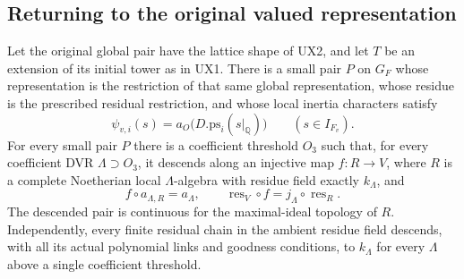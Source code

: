 \subsection{Returning to the original valued representation}

\begin{proposition}
Let the original global pair have the lattice shape of UX2,
and let $T$ be an extension of its initial tower as in UX1.
There is a small pair $P$ on $G_F$ whose representation is
the restriction of that same global representation,
whose residue is the prescribed residual restriction,
and whose local inertia characters satisfy
\[
 \psi_{v,i}(s)=a_O\bigl(D.\mathrm{ps}_i(s|_{\mathbb Q})\bigr)
 \qquad(s\in I_{F_v}).
 \tag{UX.67}
\]
For every small pair $P$ there is a coefficient threshold
$O_3$ such that, for every coefficient DVR
$\Lambda\supset O_3$, it descends along an injective map
$f:R\to V$, where $R$ is a complete Noetherian local
$\Lambda$-algebra with residue field exactly $k_\Lambda$,
and
\[
 f\circ a_{\Lambda,R}=a_\Lambda,
 \qquad \operatorname{res}_V\circ f
       =j_\Lambda\circ\operatorname{res}_R.
 \tag{UX.68}
\]
The descended pair is continuous for the maximal-ideal
topology of $R$.  Independently, every finite residual
chain in the ambient residue field descends, with all
its actual polynomial links and goodness conditions,
to $k_\Lambda$ for every $\Lambda$ above a single
coefficient threshold.
\end{proposition}

